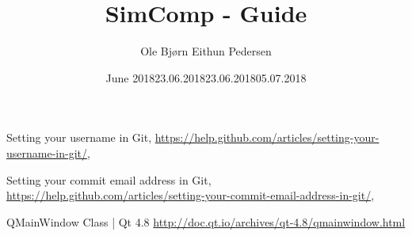 \documentclass{article}
\title{SimComp - Guide}
\author{Ole Bjørn Eithun Pedersen}
\date{June 2018}
\begin{document}
\maketitle
\tableofcontents
\newpage



\newpage






\begin{thebibliography}{9}
\label{username}
  Setting your username in Git, \url{https://help.github.com/articles/setting-your-username-in-git/}, \date{23.06.2018}
\label{email}
    Setting your commit email address in Git, \url{https://help.github.com/articles/setting-your-commit-email-address-in-git/}, \date{23.06.2018}
\label{qmainwindow}
    QMainWindow Class | Qt 4.8
    \url{http://doc.qt.io/archives/qt-4.8/qmainwindow.html}
    \date{05.07.2018}
\end{thebibliography}
\end{document}
